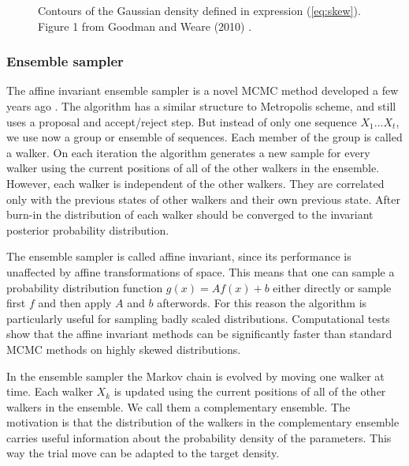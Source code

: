 \documentclass{wihuri}
\begin{document}
\begin{figure}
\centerline{}
\caption{Contours of the Gaussian density defined in expression (\ref{eq:skew}). Figure 1 from Goodman and Weare (2010) \cite{ensemble1}.
\label{fig:skewed}}
\end{figure}


\subsubsection{Ensemble sampler}

The affine invariant ensemble sampler is a novel MCMC method developed a few years ago \cite{ensemble1}. %
The algorithm has a similar structure to Metropolis scheme, and still uses a proposal and accept/reject step. But instead of only one sequence $X_{1}...X_{t}$, we use now a group or ensemble of sequences. Each member of the group is called a walker. On each iteration the algorithm generates a new sample for every walker using the  current positions of all of the other walkers in
the ensemble. However, each walker is independent of the other walkers. They are correlated only with the previous states of other walkers and their own previous state. After burn-in the distribution of each walker should be converged to the invariant posterior probability distribution.






The ensemble sampler is called affine invariant, since its performance is unaffected by affine transformations of space. This means that one can sample a probability distribution function $g(x) = Af(x) + b$ either directly or sample first $f$ and then apply $A$ and $b$ afterwords. 
For this reason the algorithm is particularly useful for sampling badly scaled distributions. Computational tests show that the affine invariant methods can be significantly faster than standard MCMC methods on highly skewed distributions.

In the ensemble sampler the  Markov chain is evolved by moving one walker at time. Each walker $X_{k}$ is updated using the current positions of all of the other walkers in
the ensemble. We call them a complementary ensemble. The motivation is that the distribution of the walkers in the complementary ensemble carries useful information about the probability density of the parameters. This way the trial move can be adapted to the target density.  
\end{document}
